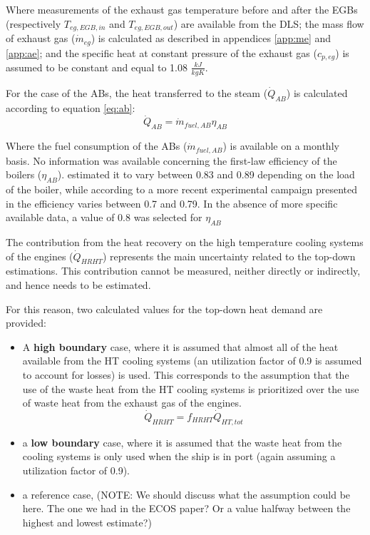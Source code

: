 \documentclass[preprint,12pt]{elsarticle}
\begin{document}
Where measurements of the exhaust gas temperature before and after the EGBs (respectively $T_{eg,EGB,in}$ and $T_{eg,EGB,out}$) are available from the DLS; the mass flow of exhaust gas ($\dot{m}_{eg}$) is calculated as described in appendices \ref{app:me} and \ref{app:ae}; and the specific heat at constant pressure of the exhaust gas ($c_{p,eg}$) is assumed to be constant and equal to 1.08 $\frac{kJ}{kgK}$.

For the case of the ABs, the heat transferred to the steam ($\dot{Q}_{AB}$) is calculated according to equation \ref{eq:ab}:
\begin{equation}
\dot{Q}_{AB} = \dot{m}_{fuel,AB} \eta_{AB}
\end{equation} \label{eq:ab}

Where the fuel consumption of the ABs ($\dot{m}_{fuel,AB}$) is available on a monthly basis. No information was available concerning the first-law efficiency of the boilers ($ \eta_{AB}$). \cite{Cohen1962} estimated it to vary between 0.83 and 0.89 depending on the load of the boiler, while according to a more recent experimental campaign presented in \cite{Mrzljak2017} the efficiency varies between 0.7 and 0.79. In the absence of more specific available data, a value of 0.8 was selected for $ \eta_{AB}$

The contribution from the heat recovery on the high temperature cooling systems of the engines ($\dot{Q}_{HRHT}$) represents the main uncertainty related to the top-down estimations. This contribution cannot be measured, neither directly or indirectly, and hence needs to be estimated. 

For this reason, two calculated values for the top-down heat demand are provided:
\begin{itemize}
	\item A \textbf{high boundary} case, where it is assumed that almost all of the heat available from the HT cooling systems (an utilization factor of 0.9 is assumed to account for losses) is used. This corresponds to the assumption that the use of the waste heat from the HT cooling systems is prioritized over the use of waste heat from the exhaust gas of the engines.
	\begin{equation}
	\dot{Q}_{HRHT} = f_{HRHT} \dot{Q}_{HT,tot} 
	\end{equation}
	\item a \textbf{low boundary} case, where it is assumed that the waste heat from the cooling systems is only used when the ship is in port (again assuming a utilization factor of 0.9). 
	\item a reference case, (NOTE: We should discuss what the assumption could be here. The one we had in the ECOS paper? Or a value halfway between the highest and lowest estimate?)
\end{itemize}
\end{document}
